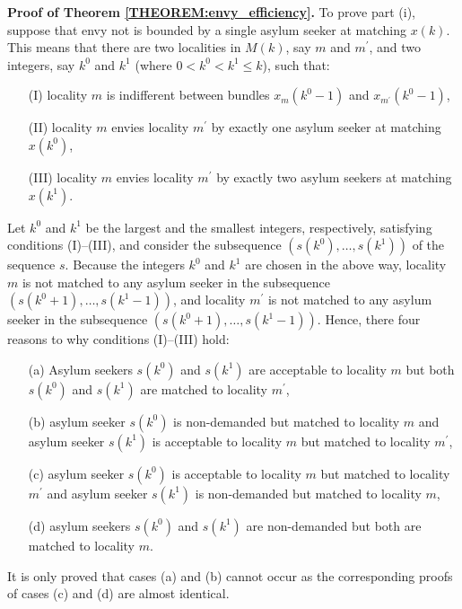 \documentclass[12pt,fleqn]{article}
\begin{document}
\noindent\textbf{Proof of Theorem \ref{THEOREM:envy_efficiency}.} To prove part (i), suppose that envy not is bounded by a single asylum seeker at matching $x(k)$. This means that there are two localities in $M(k)$, say $m$ and $m^\prime$, and two integers, say $k^0$ and $k^1$ (where $0<k^0<k^1\leq k$), such that:
\begin{itemize}
\item[(I)] locality $m$ is indifferent between bundles $x_{m}(k^0-1)$ and $x_{m^\prime}(k^0-1)$,
\item[(II)] locality $m$ envies locality $m^\prime$ by exactly one asylum seeker at matching $x(k^0)$,
\item[(III)] locality $m$ envies locality $m^\prime$ by exactly two asylum seekers at matching $x(k^1)$.
\end{itemize}
\noindent Let $k^0$ and $k^1$ be the largest and the smallest integers, respectively, satisfying conditions (I)--(III), and consider the subsequence $(s(k^0),\ldots,s(k^1))$ of the sequence $s$. Because the integers $k^0$ and $k^1$ are chosen in the above way, locality $m$ is not matched to any asylum seeker in the subsequence $(s(k^0+1),\ldots,s(k^1-1))$, and
locality $m^\prime$ is not matched to any asylum seeker in the subsequence $(s(k^0+1),\ldots,s(k^1-1))$. Hence, there four reasons to why conditions (I)--(III) hold:
\begin{itemize}
\item[(a)] Asylum seekers $s(k^0)$ and $s(k^1)$ are acceptable to locality $m$ but both $s(k^0)$ and $s(k^1)$ are matched to locality $m^\prime$,
\item[(b)] asylum seeker $s(k^0)$ is non-demanded but matched to locality $m$ and asylum seeker $s(k^1)$ is acceptable to locality $m$ but matched to locality $m^\prime$,
\item[(c)] asylum seeker $s(k^0)$ is acceptable to locality $m$ but matched to locality $m^\prime$ and asylum seeker $s(k^1)$ is non-demanded but matched to locality $m$,
\item[(d)] asylum seekers $s(k^0)$ and $s(k^1)$ are non-demanded but both are matched to locality $m$.
\end{itemize}
\noindent It is only proved that cases (a) and (b) cannot occur as the corresponding proofs of cases (c) and (d) are almost identical.
\end{document}
